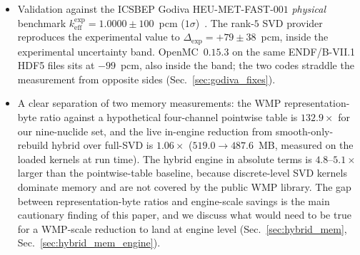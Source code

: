 \begin{itemize}
  source-convergence monitor is provided as a runtime
  diagnostic (Sec.~\ref{sec:offset}).
\item Validation against the ICSBEP Godiva
  HEU-MET-FAST-$001$ \emph{physical} benchmark
  $k_\text{eff}^\text{exp} = 1.0000 \pm 100$~pcm
  ($1\sigma$)~\cite{icsbep_hmf001}. The rank-$5$ SVD
  provider reproduces the experimental value to
  $\Delta_\text{exp} = +79 \pm 38$~pcm, inside the
  experimental uncertainty band. OpenMC~$0.15.3$ on the
  same ENDF/B-VII.1 HDF5 files sits at $-99$~pcm, also
  inside the band; the two codes straddle the measurement
  from opposite sides
  (Sec.~\ref{sec:godiva_fixes}).
\item A clear separation of two memory measurements: the
  WMP representation-byte ratio against a hypothetical
  four-channel pointwise table is $132.9\times$ for our
  nine-nuclide set, and the live in-engine reduction from
  smooth-only-rebuild hybrid over full-SVD is
  $1.06\times$ ($519.0 \to 487.6$~MB, measured on the
  loaded kernels at run time). The hybrid engine in
  absolute terms is $4.8$--$5.1\times$ larger than the
  pointwise-table baseline, because discrete-level SVD
  kernels dominate memory and are not covered by the public
  WMP library. The gap between representation-byte ratios
  and engine-scale savings is the main cautionary finding of
  this paper, and we discuss what would need to be true for
  a WMP-scale reduction to land at engine level
  (Sec.~\ref{sec:hybrid_mem}, Sec.~\ref{sec:hybrid_mem_engine}).
\end{itemize}

